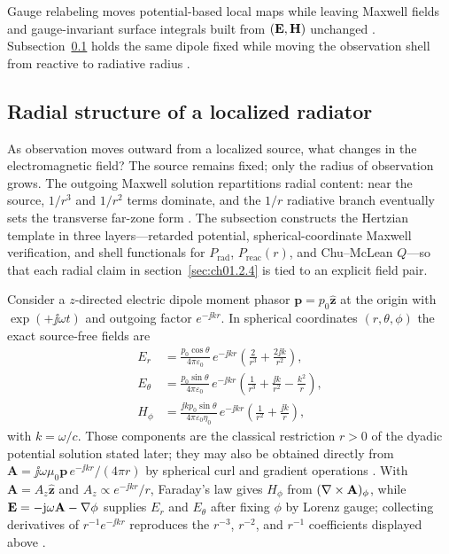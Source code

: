 Gauge relabeling moves potential-based local maps while leaving Maxwell fields and gauge-invariant surface integrals built from \((\mathbf{E},\mathbf{H})\) unchanged \cite{maxwell1873,belinfante1940}. Subsection~\ref{sec:ch01.6.4} holds the same dipole fixed while moving the observation shell from reactive to radiative radius \cite{stratton1941,chu1948}.
\subsection{Radial structure of a localized radiator}
\label{sec:ch01.6.4}

As observation moves outward from a localized source, what changes in the electromagnetic field? The source remains fixed; only the radius of observation grows. The outgoing Maxwell solution repartitions radial content: near the source, $1/r^3$ and $1/r^2$ terms dominate, and the $1/r$ radiative branch eventually sets the transverse far-zone form \cite{stratton1941,poynting1884}. The subsection constructs the Hertzian template in three layers---retarded potential, spherical-coordinate Maxwell verification, and shell functionals for $P_{\mathrm{rad}}$, $P_{\mathrm{reac}}(r)$, and Chu--McLean $Q$---so that each radial claim in section~\ref{sec:ch01.2.4} is tied to an explicit field pair.

Consider a $z$-directed electric dipole moment phasor $\mathbf{p}=p_0\hat{\mathbf{z}}$ at the origin with $\exp(+\jj\omega t)$ and outgoing factor $e^{-\jj kr}$. In spherical coordinates $(r,\theta,\phi)$ the exact source-free fields are \cite{stratton1941,harrington2001}
\begin{subequations}
\label{eq:ch1.dipole-fields-explicit}
\begin{align}
E_r&=\frac{p_0\cos\theta}{4\pi\varepsilon_0}\,e^{-\jj kr}
\left(\frac{2}{r^3}+\frac{2\jj k}{r^2}\right),
\label{eq:ch1.dipole-Er}\\[0.25em]
E_\theta&=\frac{p_0\sin\theta}{4\pi\varepsilon_0}\,e^{-\jj kr}
\left(\frac{1}{r^3}+\frac{\jj k}{r^2}-\frac{k^2}{r}\right),
\label{eq:ch1.dipole-Etheta}\\[0.25em]
H_\phi&=\frac{\jj k p_0\sin\theta}{4\pi\varepsilon_0\eta_0}\,e^{-\jj kr}
\left(\frac{1}{r^2}+\frac{\jj k}{r}\right),
\label{eq:ch1.dipole-Hphi}
\end{align}
\end{subequations}
with $k=\omega/c$. Those components are the classical restriction $r>0$ of the dyadic potential solution stated later; they may also be obtained directly from $\mathbf{A}=\jj\omega\mu_0\mathbf{p}\,e^{-\jj kr}/(4\pi r)$ by spherical curl and gradient operations \cite{stratton1941}. With $\mathbf{A}=A_z\hat{\mathbf{z}}$ and $A_z\propto e^{-\jj kr}/r$, Faraday's law gives $H_\phi$ from $(\nabla\times\mathbf{A})_\phi$, while $\mathbf{E}=-\mathrm{j}\omega\mathbf{A}-\nabla\phi$ supplies $E_r$ and $E_\theta$ after fixing $\phi$ by Lorenz gauge; collecting derivatives of $r^{-1}e^{-\jj kr}$ reproduces the $r^{-3}$, $r^{-2}$, and $r^{-1}$ coefficients displayed above \cite{stratton1941,harrington2001}.

